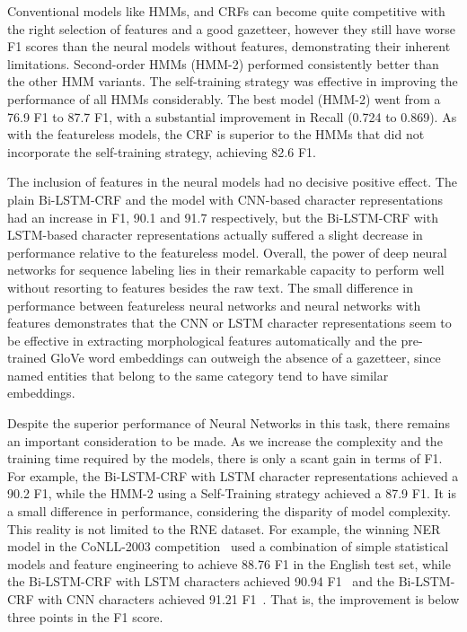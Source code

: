 \documentclass{nle}
\begin{document}
Conventional models like HMMs, and CRFs can become quite competitive with
the right selection of features and a good gazetteer, however they still have worse F1 scores
than the neural models without features, demonstrating their inherent limitations.
Second-order HMMs (HMM-2) performed consistently better than
the other HMM variants. The self-training strategy was effective in improving the 
performance of all HMMs considerably. The best model (HMM-2) went from a 76.9 F1 to
87.7 F1, with a substantial improvement in Recall (0.724 to 0.869). As with the 
featureless models, the CRF is superior to the HMMs that did not incorporate the self-training
strategy, achieving 82.6 F1.

The inclusion of features in the neural models had no decisive positive effect. The plain 
Bi-LSTM-CRF and the model with CNN-based character representations had an increase in 
F1, 90.1 and 91.7 respectively, but the Bi-LSTM-CRF with LSTM-based character representations 
actually suffered a slight decrease in performance relative to the featureless model. 
Overall, the power of deep neural networks for sequence labeling lies 
in their remarkable capacity to perform well without resorting to features besides the raw text. 
The small difference in performance between featureless neural networks and neural networks 
with features demonstrates that the CNN or LSTM character representations seem to be effective 
in extracting morphological features automatically and the pre-trained GloVe word embeddings 
can outweigh the absence of a gazetteer, since named entities that belong to the same category
tend to have similar embeddings.

Despite the superior performance of Neural Networks in this task, there remains an important 
consideration to be made. As we increase the complexity and the training time required by the models, there 
is only a scant gain in terms of F1. For example, the 
Bi-LSTM-CRF with LSTM character representations achieved a 90.2 F1, while 
the HMM-2 using a Self-Training strategy achieved a 87.9 F1. It is a small difference
in performance, considering the disparity of model complexity. This reality
is not limited to the RNE dataset. For example, 
the winning NER model in the CoNLL-2003 competition~\cite{Florian2003} used a combination of simple
statistical models and feature engineering to achieve 88.76 F1 in the English test set, 
while the Bi-LSTM-CRF with LSTM characters achieved 90.94 F1~\cite{Lample2016} and the Bi-LSTM-CRF with 
CNN characters achieved 91.21 F1~\cite{Ma2016}. That is,
the improvement is below three points in the F1 score.
\end{document}
